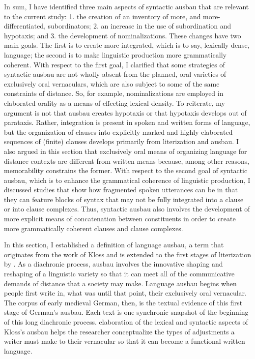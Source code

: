 In sum, I have identified three main aspects of syntactic ausbau that are relevant to the current study: 1. the creation of an inventory of more, and more-differentiated, subordinators; 2. an increase in the use of subordination and hypotaxis; and 3. the development of nominalizations. These changes have two main goals. The first is to create more integrated, which is to say, lexically dense, language; the second is to make linguistic production more grammatically coherent. With respect to the first goal, I clarified that some strategies of syntactic ausbau are not wholly absent from the planned, oral varieties of exclusively oral vernaculars, which are also subject to some of the same constraints of distance. So, for example, nominalizations are employed in elaborated orality as a means of effecting lexical density. To reiterate, my argument is not that ausbau creates hypotaxis or that hypotaxis develops out of parataxis. Rather, integration is present in spoken and written forms of language, but the organization of clauses into explicitly marked and highly elaborated sequences of (finite) clauses develops primarily from literization and ausbau. I also argued in this section that exclusively oral means of organizing language for distance contexts are different from written means because, among other reasons, memorability constrains the former. With respect to the second goal of syntactic ausbau, which is to enhance the grammatical coherence of linguistic production, I discussed studies that show how fragmented spoken utterances can be in that they can feature blocks of syntax that may not be fully integrated into a clause or into clause complexes. Thus, syntactic ausbau also involves the development of more explicit means of concatenation between constituents in order to create more grammatically coherent clauses and clause complexes.

In this section, I established a definition of language ausbau, a term that originates from the work of Kloss and is extended to the first stages of literization by \citet{KochOesterreicher1994}. As a diachronic process, ausbau involves the innovative shaping and reshaping of a linguistic variety so that it can meet all of the communicative demands of distance that a society may make. Language ausbau begins when people first write in, what was until that point, their exclusively oral vernacular. The corpus of early medieval German, then, is the textual evidence of this first stage of German’s ausbau. Each text is one synchronic snapshot of the beginning of this long diachronic process.  elaboration of the lexical and syntactic aspects of Kloss’s ausbau helps the researcher conceptualize the types of adjustments a writer must make to their vernacular so that it can become a functional written language.

